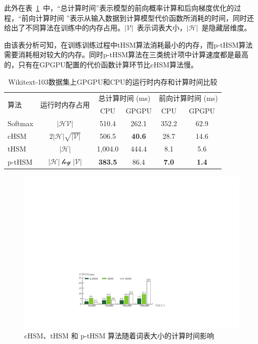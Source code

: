 此外在表~\ref{tab:time}~中，``总计算时间''表示模型的前向概率计算和后向梯度优化的过程，``前向计算时间 ''表示从输入数据到计算模型代价函数所消耗的时间，同时还给出了不同算法在训练中的内存占用。$\mathcal{|V|}$~表示词表大小，$\mathcal{|H|}$~是隐藏层维度。

由该表分析可知，在训练训练过程中tHSM算法消耗最小的内存，而p-tHSM算法需要消耗相对较大的内存。同时p-tHSM算法在三类统计项中计算速度都是最高的，只有在GPGPU配置的代价函数计算环节比cHSM算法慢。

\begin{table}[!ht]
  \centering
  \caption{Wikitext-103数据集上GPGPU和CPU的运行时内存和计算时间比较\label{tab:time}}
\begin{tabular}{lccccc}
  \toprule
 \multirow{2}{*}{算法}  &\multirow{2}{*}{运行时内存占用} &\multicolumn{2}{c}{总计算时间 (ms)} & \multicolumn{2}{c}{前向计算时间 (ms)}   \\
   \cmidrule(lr){3-4}  \cmidrule(lr){5-6}
	& & CPU&GPGPU & CPU& GPGPU \\ \midrule
Softmax & $\mathcal{|HV|}$ &510.4  &262.1&352.2& 62.9 \\
cHSM    & $2\mathcal{|H|\sqrt{|V|}}$&506.5  &\textbf{40.6}&28.7&14.6 \\
tHSM    &$\mathcal{|H|}$&1,004.0 &444.4 & 8.1&  5.6   \\
p-tHSM  &$\mathcal{|H|\log{|V|}}$ &\textbf{383.5}&	86.4 &\textbf{7.0}&	\textbf{1.4} \\
  \bottomrule
\end{tabular}
\end{table}

\begin{figure}[!t]
  \centering
  \includegraphics[width=.87\columnwidth]{./figures/all_time.pdf}
  \caption{cHSM、tHSM 和 p-tHSM 算法随着词表大小的计算时间影响}\label{fig:hsm_benchmark}
\end{figure}

